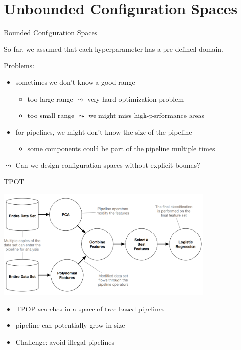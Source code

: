 \section{Unbounded Configuration Spaces}
\begin{frame}[c]{Bounded Configuration Spaces}

So far, we assumed that each hyperparameter has a pre-defined domain.

\medskip
Problems:
\begin{itemize}
  \item sometimes we don't know a good range
  \begin{itemize}
     \item too large range $\leadsto$ very hard optimization problem
     \item too small range $\leadsto$ we might miss high-performance areas
  \end{itemize}
  \pause
  \medskip
  \item for pipelines, we might don't know the size of the pipeline
  \begin{itemize}
    \item some components could be part of the pipeline multiple times
  \end{itemize}
\end{itemize}

\pause
\bigskip

$\leadsto$ Can we design configuration spaces without explicit bounds?

\end{frame}
\begin{frame}[c]{TPOT }

\centering
\includegraphics[width=0.8\textwidth]{images/tpot_tree}

\begin{itemize}
  \item TPOP searches in a space of tree-based pipelines
  \item pipeline can potentially grow in size
  \item Challenge: avoid illegal pipelines
\end{itemize}

\end{frame}
